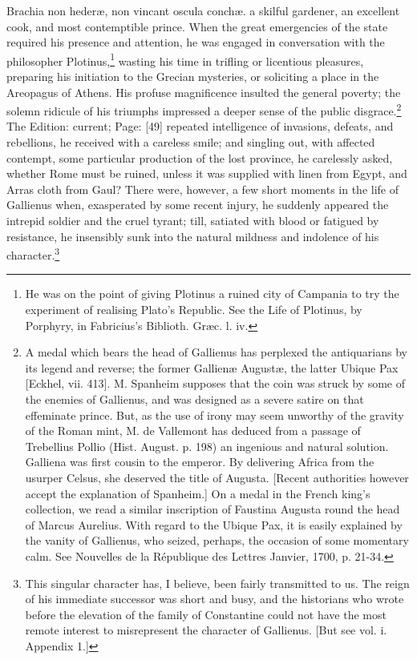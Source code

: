 {Brachia non hederæ, non vincant oscula conchæ.} a skilful gardener, an excellent cook, and most contemptible prince. When the great emergencies of the state required his presence and attention, he was engaged in conversation with the philosopher Plotinus,\footnote{He was on the point of giving Plotinus a ruined city of Campania to try the experiment of realising Plato\texthebrew{}’s Republic. See the Life of Plotinus, by Porphyry, in Fabricius\texthebrew{}’s Biblioth. Græc. l. iv.} wasting his time in trifling or licentious pleasures, preparing his initiation to the Grecian mysteries, or soliciting a place in the Areopagus of Athens. His profuse magnificence insulted the general poverty; the solemn ridicule of his triumphs impressed a deeper sense of the public disgrace.\footnote{A medal which bears the head of Gallienus has perplexed the antiquarians by its legend and reverse; the former Gallienæ Augustæ, the latter Ubique Pax [Eckhel, vii. 413]. M. Spanheim supposes that the coin was struck by some of the enemies of Gallienus, and was designed as a severe satire on that effeminate prince. But, as the use of irony may seem unworthy of the gravity of the Roman mint, M. de Vallemont has deduced from a passage of Trebellius Pollio (Hist. August. p. 198) an ingenious and natural solution. Galliena was first cousin to the emperor. By delivering Africa from the usurper Celsus, she deserved the title of Augusta. [Recent authorities however accept the explanation of Spanheim.] On a medal in the French king\texthebrew{}’s collection, we read a similar inscription of Faustina Augusta round the head of Marcus Aurelius. With regard to the Ubique Pax, it is easily explained by the vanity of Gallienus, who seized, perhaps, the occasion of some momentary calm. See Nouvelles de la République des Lettres Janvier, 1700, p. 21-34.} The Edition: current; Page: [49] repeated intelligence of invasions, defeats, and rebellions, he received with a careless smile; and singling out, with affected contempt, some particular production of the lost province, he carelessly asked, whether Rome must be ruined, unless it was supplied with linen from Egypt, and Arras cloth from Gaul? There were, however, a few short moments in the life of Gallienus when, exasperated by some recent injury, he suddenly appeared the intrepid soldier and the cruel tyrant; till, satiated with blood or fatigued by resistance, he insensibly sunk into the natural mildness and indolence of his character.\footnote{This singular character has, I believe, been fairly transmitted to us. The reign of his immediate successor was short and busy, and the historians who wrote before the elevation of the family of Constantine could not have the most remote interest to misrepresent the character of Gallienus. [But see vol. i. Appendix 1.]}

